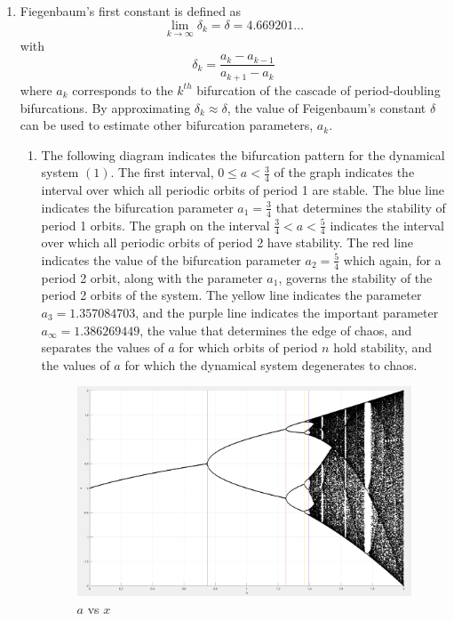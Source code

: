 \documentclass[a4paper]{article}
\begin{document}
\begin{enumerate}[label=\textbf{\arabic*.}]
\begin{enumerate}
	\end{enumerate}

	\pagebreak


	\item Fiegenbaum's first constant is defined as 
	$$\lim_{k \to \infty}{\delta_k} = \delta = 4.669201 \dots $$
	with 
	$$\delta_k = \frac{a_k - a_{k-1}}{a_{k+1}-a_k}$$
	where $a_k$ corresponds to the $k^{th}$	bifurcation of the cascade of period-doubling bifurcations. By approximating $\delta_k \approx \delta$, the value of Feigenbaum's constant $\delta$ can be used to estimate other bifurcation parameters, $a_k$. 

	\begin{enumerate}
		\item The following diagram indicates the bifurcation pattern for the dynamical system $(1)$. The first interval, $0 \leq a < \frac{3}{4}$ of the graph indicates the interval over which all periodic orbits of period 1 are stable. The blue line indicates the bifurcation parameter $a_1 = \frac{3}{4}$ that determines the stability of period 1 orbits. The graph on the interval $\frac{3}{4} < a < \frac{5}{4}$ indicates the interval over which all periodic orbits of period 2 have stability. The red line indicates the value of the bifurcation parameter $a_2 = \frac{5}{4}$ which again, for a period 2 orbit, along with the parameter $a_1$, governs the stability of the period 2 orbits of the system. The yellow line indicates the parameter $a_3 = 1.357084703$, and the purple line indicates the important parameter $a_{\infty} = 1.386269449$, the value that determines the edge of chaos, and separates the values of $a$ for which orbits of period $n$ hold stability, and the values of $a$ for which the dynamical system degenerates to chaos.

		\begin{center}
		\begin{figure}[h!]
		\caption{$a$ vs $x$}
			\includegraphics[width=\linewidth]{bifurcation_graph_3.png}
		\end{figure}
		\end{center}


\end{enumerate}
\end{enumerate}
\end{document}

